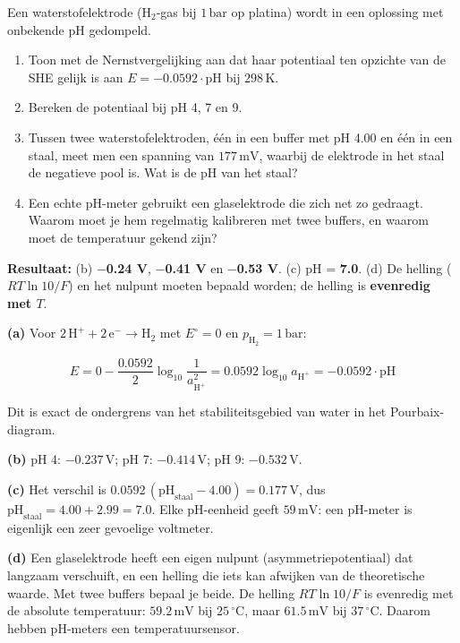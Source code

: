 \begin{oefening}
Een waterstofelektrode (\(\mathrm{H_2}\)-gas bij \(1\,\mathrm{bar}\) op platina) wordt in een oplossing met onbekende pH gedompeld.

\begin{enumerate}
\item[(a)]
  Toon met de Nernstvergelijking aan dat haar potentiaal ten opzichte van de SHE gelijk is aan \(E = -0.0592\cdot\mathrm{pH}\) bij \(298\,\mathrm{K}\).
\item[(b)]
  Bereken de potentiaal bij pH 4, 7 en 9.
\item[(c)]
  Tussen twee waterstofelektroden, één in een buffer met pH 4.00 en één in een staal, meet men een spanning van \(177\,\mathrm{mV}\), waarbij de elektrode in het staal de negatieve pool is. Wat is de pH van het staal?
\item[(d)]
  Een echte pH-meter gebruikt een glaselektrode die zich net zo gedraagt. Waarom moet je hem regelmatig kalibreren met twee buffers, en waarom moet de temperatuur gekend zijn?
\end{enumerate}
\end{oefening}
\begin{oplossing}
\textbf{Resultaat:} (b) \textbf{\ensuremath{-}0.24 V}, \textbf{\ensuremath{-}0.41 V} en \textbf{\ensuremath{-}0.53 V}. (c) pH = \textbf{7.0}. (d) De helling (\(RT\ln 10/F\)) en het nulpunt moeten bepaald worden; de helling is \textbf{evenredig met \(T\)}.

\textbf{(a)} Voor \(\mathrm{2\,H^+ + 2\,e^- \rightarrow H_2}\) met \(E^\circ = 0\) en \(p_{\mathrm{H_2}} = 1\,\mathrm{bar}\):

\[
E = 0 - \frac{0.0592}{2}\log_{10}\frac{1}{a_{\mathrm{H^+}}^2} = 0.0592\log_{10}a_{\mathrm{H^+}} = -0.0592\cdot\mathrm{pH}
\]

Dit is exact de ondergrens van het stabiliteitsgebied van water in het Pourbaix-diagram.

\textbf{(b)} pH 4: \(-0.237\,\mathrm{V}\); pH 7: \(-0.414\,\mathrm{V}\); pH 9: \(-0.532\,\mathrm{V}\).

\textbf{(c)} Het verschil is \(0.0592\,(\mathrm{pH}_{\text{staal}} - 4.00) = 0.177\,\mathrm{V}\), dus \(\mathrm{pH}_{\text{staal}} = 4.00 + 2.99 = 7.0\). Elke pH-eenheid geeft \(59\,\mathrm{mV}\): een pH-meter is eigenlijk een zeer gevoelige voltmeter.

\textbf{(d)} Een glaselektrode heeft een eigen nulpunt (asymmetriepotentiaal) dat langzaam verschuift, en een helling die iets kan afwijken van de theoretische waarde. Met twee buffers bepaal je beide. De helling \(RT\ln10/F\) is evenredig met de absolute temperatuur: \(59.2\,\mathrm{mV}\) bij \(25\,^\circ\mathrm{C}\), maar \(61.5\,\mathrm{mV}\) bij \(37\,^\circ\mathrm{C}\). Daarom hebben pH-meters een temperatuursensor.
\end{oplossing}

